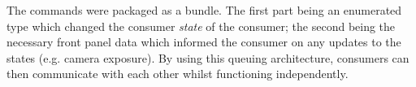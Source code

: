 The commands were packaged as a bundle.
The first part being an enumerated type which changed the consumer \emph{state} of the consumer; the second being the necessary front panel data which informed the consumer on any updates to the states (e.g. camera exposure).
By using this queuing architecture, consumers can then communicate with each other whilst functioning independently.

%
%



